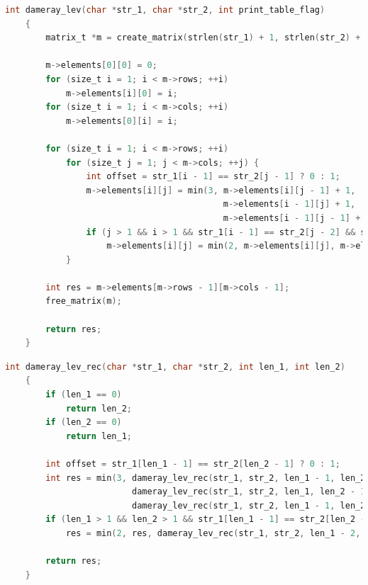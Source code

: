 \documentclass[a4paper,14pt, unknownkeysallowed]{extreport}
\begin{document}
	
	\begin{lstlisting}[label=damlev,caption=Листинг итерационного алгоритма поиска расстояния Дамерау-Левенштейна,language=C]
    int dameray_lev(char *str_1, char *str_2, int print_table_flag)
    {
        matrix_t *m = create_matrix(strlen(str_1) + 1, strlen(str_2) + 1);
    
        m->elements[0][0] = 0;
        for (size_t i = 1; i < m->rows; ++i)
            m->elements[i][0] = i;
        for (size_t i = 1; i < m->cols; ++i)
            m->elements[0][i] = i;
    
        for (size_t i = 1; i < m->rows; ++i)
            for (size_t j = 1; j < m->cols; ++j) {
                int offset = str_1[i - 1] == str_2[j - 1] ? 0 : 1;
                m->elements[i][j] = min(3, m->elements[i][j - 1] + 1,
                                           m->elements[i - 1][j] + 1,
                                           m->elements[i - 1][j - 1] + offset);
                if (j > 1 && i > 1 && str_1[i - 1] == str_2[j - 2] && str_1[i - 2] == str_2[j - 1])
                    m->elements[i][j] = min(2, m->elements[i][j], m->elements[i - 2][j - 2] + 1);
            }
    
        int res = m->elements[m->rows - 1][m->cols - 1];
        free_matrix(m);
    
        return res;
    } 
	\end{lstlisting}
	
	\bigbreak

	\begin{lstlisting}[label=damlevrec,caption=Листинг рекурсивного алгоритма поиска расстояния Дамерау-Левенштейна,language=C]
    int dameray_lev_rec(char *str_1, char *str_2, int len_1, int len_2)
    {
        if (len_1 == 0)
            return len_2;
        if (len_2 == 0)
            return len_1;
    
        int offset = str_1[len_1 - 1] == str_2[len_2 - 1] ? 0 : 1;
        int res = min(3, dameray_lev_rec(str_1, str_2, len_1 - 1, len_2)                    + 1,
                         dameray_lev_rec(str_1, str_2, len_1, len_2 - 1) + 1,
                         dameray_lev_rec(str_1, str_2, len_1 - 1, len_2 - 1) + offset);
        if (len_1 > 1 && len_2 > 1 && str_1[len_1 - 1] == str_2[len_2 - 2] && str_1[len_1 - 2] == str_2[len_2 - 1])
            res = min(2, res, dameray_lev_rec(str_1, str_2, len_1 - 2, len_2 - 2) + 1);
    
        return res;
    } 
	\end{lstlisting}
	
\end{document}
